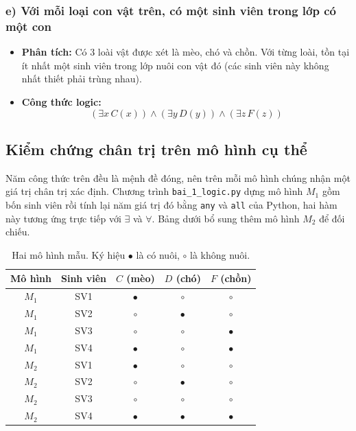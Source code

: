 \documentclass[12pt,a4paper]{article}
\begin{document}
\subsubsection{e) Với mỗi loại con vật trên, có một sinh viên trong lớp có một con}
\begin{itemize}
    \item \textbf{Phân tích:} Có 3 loài vật được xét là mèo, chó và chồn. Với từng loài, tồn tại ít nhất một sinh viên trong lớp nuôi con vật đó (các sinh viên này không nhất thiết phải trùng nhau).
    \item \textbf{Công thức logic:}
    \begin{equation}
        (\exists x \, C(x)) \land (\exists y \, D(y)) \land (\exists z \, F(z))
    \end{equation}
\end{itemize}

\subsection{Kiểm chứng chân trị trên mô hình cụ thể}

Năm công thức trên đều là mệnh đề đóng, nên trên mỗi mô hình chúng nhận một giá trị chân trị xác định. Chương trình \texttt{bai\_1\_logic.py} dựng mô hình $M_1$ gồm bốn sinh viên rồi tính lại năm giá trị đó bằng \texttt{any} và \texttt{all} của Python, hai hàm này tương ứng trực tiếp với $\exists$ và $\forall$. Bảng dưới bổ sung thêm mô hình $M_2$ để đối chiếu.

\begin{table}[h!]
\centering
\begin{tabular}{|c|c|c|c|c|}
\hline
\textbf{Mô hình} & \textbf{Sinh viên} & $C$ (mèo) & $D$ (chó) & $F$ (chồn) \\
\hline
$M_1$ & SV1 & $\bullet$ & $\circ$ & $\circ$ \\
$M_1$ & SV2 & $\circ$ & $\bullet$ & $\circ$ \\
$M_1$ & SV3 & $\circ$ & $\circ$ & $\bullet$ \\
$M_1$ & SV4 & $\bullet$ & $\circ$ & $\bullet$ \\
\hline
$M_2$ & SV1 & $\bullet$ & $\circ$ & $\circ$ \\
$M_2$ & SV2 & $\circ$ & $\bullet$ & $\circ$ \\
$M_2$ & SV3 & $\circ$ & $\circ$ & $\circ$ \\
$M_2$ & SV4 & $\bullet$ & $\bullet$ & $\bullet$ \\
\hline
\end{tabular}
\caption{Hai mô hình mẫu. Ký hiệu $\bullet$ là có nuôi, $\circ$ là không nuôi.}
\end{table}
\end{document}
